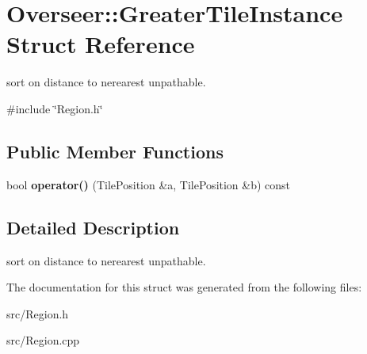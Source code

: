 \hypertarget{structOverseer_1_1GreaterTileInstance}{}\section{Overseer\+:\+:Greater\+Tile\+Instance Struct Reference}
\label{structOverseer_1_1GreaterTileInstance}


sort on distance to nerearest unpathable.  




{\ttfamily \#include \char`\"{}Region.\+h\char`\"{}}

\subsection*{Public Member Functions}
\begin{DoxyCompactItemize}
\item 
\mbox{\label{structOverseer_1_1GreaterTileInstance_af97018d6b6478888ea4ab37722d29309}} 
bool {\bfseries operator()} (Tile\+Position \&a, Tile\+Position \&b) const
\end{DoxyCompactItemize}


\subsection{Detailed Description}
sort on distance to nerearest unpathable. 

The documentation for this struct was generated from the following files\+:\begin{DoxyCompactItemize}
\item 
src/Region.\+h\item 
src/Region.\+cpp\end{DoxyCompactItemize}
